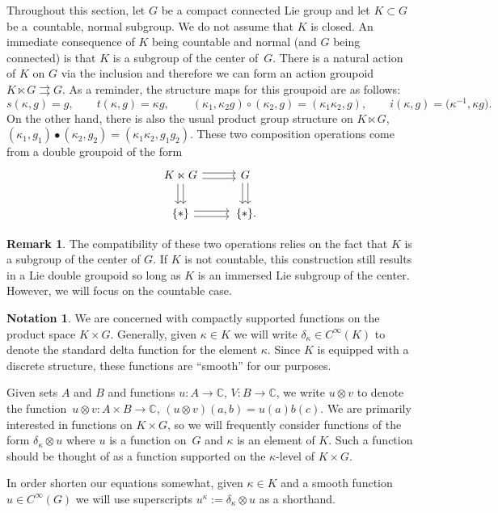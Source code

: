 \documentclass[10pt,a4paper]{amsart}
\numberwithin{equation}{section}
\theoremstyle{definition}
\newtheorem{Remark}[Theorem]{Remark}
\newtheorem{notation}[Theorem]{Notation}
\newcommand{\BBC}{\mathbb{C}}
\newcommand{\darrow}{\arrow[d, shift right] \arrow[d, shift left]}
\newcommand{\rarrow}{\arrow[r, shift right] \arrow[r, shift left]}
\newcommand{\grpd}{\rightrightarrows}
\begin{document}
Throughout this section, let $ G $ be a compact connected Lie group and let $ K \subset G $ be a~countable, normal subgroup. We do not assume that $ K $ is closed. An immediate consequence of $ K $ being countable and normal (and $ G $ being connected) is that $ K $ is a subgroup of the center of~$ G $. There is a natural action of $ K $ on $ G $ via the inclusion and therefore we can form an action groupoid
$K \ltimes G \grpd G $.
As a reminder, the structure maps for this groupoid are as follows:
\[ s(\kappa, g) = g, \qquad t(\kappa, g) = \kappa g,\qquad
 (\kappa_1, \kappa_2 g) \circ (\kappa_2, g) = (\kappa_1 \kappa_2, g),  \qquad
 i(\kappa,g) = \big( \kappa^{-1}, \kappa g\big). \]
On the other hand, there is also the usual product group structure on $ K \ltimes G $,
$(\kappa_1, g_1) \bullet (\kappa_2, g_2) = (\kappa_1 \kappa_2, g_1 g_2) $.
These two composition operations come from a double groupoid of the form
\[
\begin{tikzcd}
K \ltimes G \darrow \rarrow & G \darrow \\
\{* \} \rarrow &\, \{ * \}.
\end{tikzcd}
\]
\begin{Remark}
   The compatibility of these two operations relies on the fact that $ K $ is a subgroup of the center of $ G $. If $ K $ is not countable, this construction still results in a Lie double groupoid so long as $ K $ is an immersed Lie subgroup of the center. However, we will focus on the countable case.
\end{Remark}


\begin{notation}
We are concerned with compactly supported functions on the product space $ K \times G $. Generally, given $ \kappa \in K $ we will write $ \delta_\kappa \in C^\infty(K) $ to denote the standard delta function for the element $ \kappa$. Since $ K $ is equipped with a discrete structure, these functions are ``smooth'' for our purposes.

Given sets $ A $ and $ B $ and functions $ u \colon A \to \BBC $, $ V \colon B \to \BBC $, we write $ u \otimes v $ to denote the function~${u \otimes v \colon A \times B \to \BBC}$, $ (u \otimes v)(a,b) = u(a) b(c)$.
We are primarily interested in functions on $ K \times G $, so we will frequently consider functions of the form $ \delta_\kappa \otimes u $ where $ u $ is a function on~$ G $ and $ \kappa $ is an element of $ K $. Such a function should be thought of as a function supported on the $ \kappa$-level of $ K \times G $.

In order shorten our equations somewhat, given $ \kappa \in K $ and a smooth function $ u \in C^\infty(G) $ we will use superscripts
$u^\kappa := \delta_{\kappa} \otimes u $
as a shorthand.
\end{notation}
\end{document}
